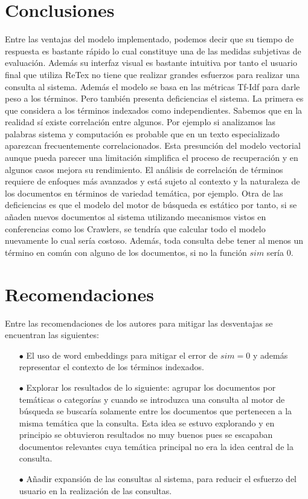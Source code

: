 \section{Conclusiones}

Entre las ventajas del modelo implementado, podemos decir que su tiempo de respuesta es bastante rápido lo cual constituye una de las medidas subjetivas de evaluación. Además su interfaz visual es bastante intuitiva por tanto el usuario final que utiliza ReTex no tiene que realizar grandes esfuerzos para realizar una consulta al sistema. Además el modelo se basa en las métricas Tf-Idf para darle peso a los términos. Pero también presenta deficiencias el sistema. La primera es que considera a los términos indexados como independientes. Sabemos que en la realidad sí existe correlación entre  algunos. Por ejemplo si analizamos las palabras sistema y computación es probable que en un texto especializado aparezcan frecuentemente correlacionados. Esta presunción del modelo vectorial aunque pueda parecer una  limitación simplifica el proceso de recuperación y en algunos casos mejora su rendimiento. El análisis de correlación de términos requiere de enfoques más avanzados y está sujeto al contexto y la naturaleza de los documentos en términos de variedad temática, por ejemplo. Otra de las deficiencias es que el modelo del motor de búsqueda es estático por tanto, si se añaden nuevos documentos al sistema utilizando mecanismos vistos en conferencias como los Crawlers, se tendría que calcular todo el modelo nuevamente lo cual sería costoso. Además, toda consulta debe tener al menos un término en común con alguno de los documentos, si no la función $sim$ sería 0.

\section{Recomendaciones}

Entre las recomendaciones de los autores para mitigar las desventajas se encuentran las siguientes:

\begin{enumerate}
    \item[$\bullet$] El uso de word embeddings para mitigar el error de $sim = 0$ y además representar el contexto de los términos indexados.
    \item[$\bullet$] Explorar los resultados de lo siguiente: agrupar los documentos por temáticas o categorías y cuando se introduzca una consulta al motor de búsqueda se buscaría solamente entre los documentos que pertenecen a la misma temática que la consulta. Esta idea se estuvo explorando y en principio se obtuvieron resultados no muy buenos pues se escapaban documentos relevantes cuya temática principal no era la idea central de la consulta. 
    \item[$\bullet$] Añadir expansión de las consultas al sistema, para reducir el esfuerzo del usuario en la realización de las consultas.
\end{enumerate}